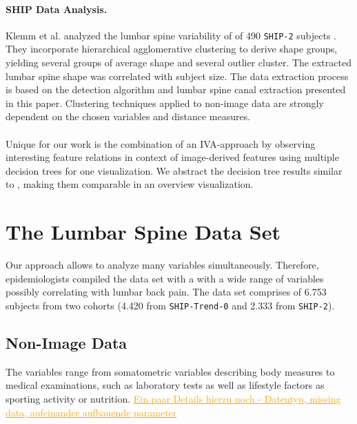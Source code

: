 \documentclass[a4paper,twoside]{style/article}
\newcommand{\com}[1]{\textcolor{orange}{\uline{#1}}}
\begin{document}
\paragraph{SHIP Data Analysis.}
Klemm et al. analyzed the lumbar spine variability of of 490 \texttt{SHIP-2} subjects \cite{Klemm2013VMV}.
They incorporate hierarchical agglomerative clustering to derive shape groups, yielding several groups of average shape and several outlier cluster.
The extracted lumbar spine shape was correlated with subject size.
The data extraction process is based on the detection algorithm and lumbar spine canal extraction presented in this paper.
Clustering techniques applied to non-image data are strongly dependent on the chosen variables and distance measures.
\\\\
Unique for our work is the combination of an IVA-approach by observing interesting feature relations in context of image-derived features using multiple decision trees for one visualization.
We abstract the decision tree results similar to \cite{Turkay}, making them comparable in an overview visualization.
\section{The Lumbar Spine Data Set}
\label{sec:MaterialsAndMethod}
\noindent Our approach allows to analyze many variables simultaneously.
Therefore, epidemiologists compiled the data set with a with a wide range of variables possibly correlating with lumbar back pain.
The data set comprises of 6.753 subjects from two cohorts (4.420 from \texttt{SHIP-Trend-0} and 2.333 from \texttt{SHIP-2}).

\subsection{Non-Image Data}
The variables range from somatometric variables describing body measures to medical examinations, such as laboratory tests as well as lifestyle factors as sporting activity or nutrition. \com{Ein paar Details hierzu noch - Datentyp, missing data, aufeinander aufbauende parameter}
\end{document}
